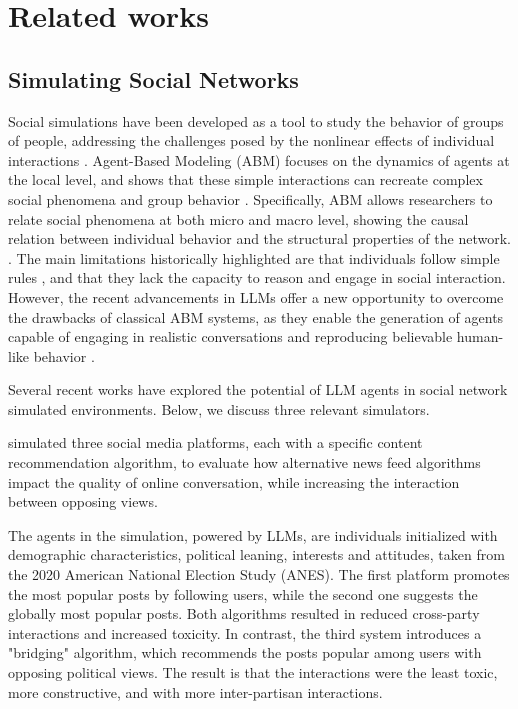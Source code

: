 \section{Related works}
\label{sec:relatedworks}


\subsection{Simulating Social Networks}

Social simulations have been developed as a tool to study the behavior of groups of people, addressing the challenges posed by the nonlinear effects of individual interactions \cite{squazzoni2014socialsimulation}.
Agent-Based Modeling (ABM) focuses on the dynamics of agents at the local level, and shows that these simple interactions can recreate complex social phenomena and group behavior \cite{macy2002abm}.
Specifically, ABM allows researchers to relate social phenomena at both micro and macro level, showing the causal relation between individual behavior and the structural properties of the network. \cite{squazzoni2014socialsimulation}.
The main limitations historically highlighted are that individuals follow simple rules \cite{conte2014agent}, and that they lack the capacity to reason and engage in social interaction.\cite{törnberg2023evaluate}
However, the recent advancements in LLMs offer a new opportunity to overcome the drawbacks of classical ABM systems, as they enable the generation of agents capable of engaging in realistic conversations and reproducing believable human-like behavior \cite{park2023genagents}.

Several recent works have explored the potential of LLM agents in social network simulated environments. Below, we discuss three relevant simulators.
\medskip

\citet{törnberg2023evaluate} simulated three social media platforms, each with a specific content recommendation algorithm, to evaluate how alternative news feed algorithms impact the quality of online conversation, while increasing the interaction between opposing views.

The agents in the simulation, powered by LLMs, are individuals initialized with demographic characteristics, political leaning, interests and attitudes, taken from the 2020 American National Election Study (ANES).
The first platform promotes the most popular posts by following users, while the second one suggests the globally most popular posts. Both algorithms resulted in reduced cross-party interactions and increased toxicity.
In contrast, the third system introduces a "bridging" algorithm, which recommends the posts popular among users with opposing political views. The result is that the interactions were the least toxic, more constructive, and with more inter-partisan interactions.

